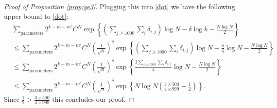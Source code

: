 \documentclass[12pt]{article}
\numberwithin{equation}{section}
\numberwithin{equation}{section}
\theoremstyle{definition}
\renewcommand{\1}{\bf 1}
\begin{document}
\begin{proof}[Proof of Proposition \ref{prop:ge3}]

Plugging this into \eqref{dot} we have the following upper bound to \eqref{dot}:
\begin{equation}
\begin{split}
&\sum_{\text{parameters}} 2^{k-m-m'} C^{N} \exp\left\{ \left(\sum_{j\ge 1000}\sum_{i}\delta_{i,j} \right)\log N- \delta  \log k - \frac{N\log N}{2} \right\}\\
&\le \sum_{\text{parameters}} 2^{k-m-m'} C^{N} \left( \frac{1}{\sqrt{n}} \right)^{\delta}\exp\left\{ \left( \sum_{j\ge 1000}\sum_{i}\delta_{i,j} \right) \log N - \frac{\delta}{4}\log N - \frac{N\log N}{2} \right\}\\
& \le \sum_{\text{parameters}} 2^{k-m-m'} C^{N}\left( \frac{1}{\sqrt{n}} \right)^{\delta} \exp\left\{ \frac{3\sum_{j\ge 1000}\sum_{i}\delta_{i,j}}{4} \log N - \frac{N\log N}{2} \right\}\\
& \le \sum_{\text{parameters}} 2^{k-m-m'} C^{N} \left( \frac{1}{\sqrt{n}} \right)^{\delta} \exp\left\{ N\log N \left(  \frac{3\times 500}{4\times 999}- \frac{1}{2}\right) \right\}.
\end{split}
\end{equation}
Since $\frac{1}{2}> \frac{3\times 500}{4\times 999}$ this concludes our proof.





\end{proof}
\end{document}

